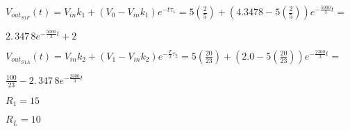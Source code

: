 \documentclass{article}
\begin{document}
$V_{out_{S1F}}\left( t\right) =V_{in}k_{1}+\left( V_{0}-V_{in}k_{1}\right)
e^{-t\tau _{1}}=5\left( \frac{2}{5}\right) +\left( \allowbreak
4.3478-5\left( \frac{2}{5}\right) \right) e^{-\frac{5000}{3}t}=$

$\allowbreak 2.\,\allowbreak 347\,8e^{-\frac{5000}{3}t}+2$

$V_{out_{S1A}}\left( t\right) =V_{in}k_{2}+\left( V_{1}-V_{in}k_{2}\right)
e^{-\frac{T}{2}\tau _{2}}=5\left( \frac{20}{23}\right) +\left( \allowbreak
2.0-5\left( \frac{20}{23}\right) \right) e^{-\frac{2300}{3}t}=\allowbreak $

$\frac{100}{23}-2.\,\allowbreak 347\,8e^{-\frac{2300}{3}t}\allowbreak $

\vspace{1pt}

\vspace{1pt}

\vspace{1pt}

\vspace{1pt}

\vspace{1pt}

\vspace{1pt}

\vspace{1pt}

\vspace{1pt}

\vspace{1pt}

\vspace{1pt}

\vspace{1pt}

\vspace{1pt}

\vspace{1pt}

\vspace{1pt}

\vspace{1pt}

\vspace{1pt}

\vspace{1pt}

\vspace{1pt}

\vspace{1pt}

$R_{1}=15$

$R_{L}=10$
\end{document}
